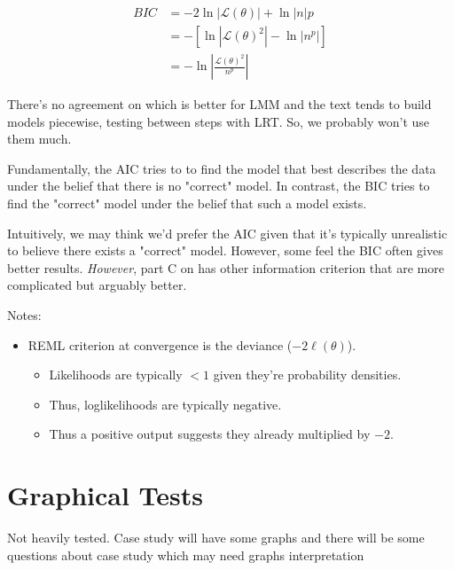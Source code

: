 \documentclass[english]{article}
\begin{document}
\begin{multicols*}{2}
\begin{align*}
	BIC
	&=	-2\ln|\mathcal{L}(\theta)| + \ln|n|p	\\
	&=	-\left[\ln\left|\mathcal{L}(\theta)^{2}\right| - \ln\left|n^{p}\right|\right]	\\
	&=	-\ln\left|\frac{\mathcal{L}(\theta)^{2}}{n^{p}}\right|	
\end{align*}

\bigskip

\begin{rappel_enhanced}[Context]
There's no agreement on which is better for LMM and the text tends to build models piecewise, testing between steps with LRT. So, we probably won't use them much.

\bigskip

Fundamentally, the AIC tries to to find the model that best describes the data under the belief that there is no "correct" model. In contrast, the BIC tries to find the "correct" model under the belief that such a model exists. 

\bigskip

Intuitively, we may think we'd prefer the AIC given that it's typically unrealistic to believe there exists a "correct" model. However, some feel the BIC often gives better results. \textit{However}, part C on \textit{\underline{}} has other information criterion that are more complicated but arguably better. 
\end{rappel_enhanced}


\bigskip

Notes:
\begin{itemize}
	\item	REML criterion at convergence is the deviance ($-2\ell(\theta)$).
		\begin{itemize}
		\item	Likelihoods are typically $<1$ given they're probability densities.
		\item	Thus, loglikelihoods are typically negative.
		\item	Thus a positive output suggests they already multiplied by $-2$.
		\end{itemize}
\end{itemize}



\section{Graphical Tests}
Not heavily tested.
	Case study will have some graphs and there will be some questions about case study which may need graphs interpretation
	

\end{multicols*}
\end{document}
